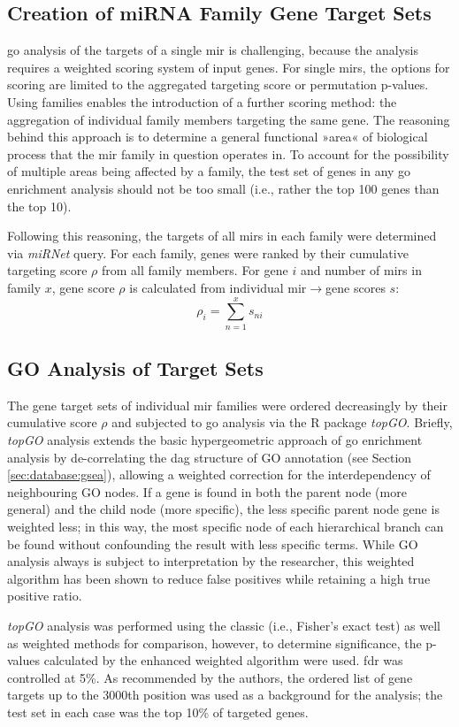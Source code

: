 \begin{method}

\subsection{Creation of miRNA Family Gene Target Sets}
\ac{go} analysis of the targets of a single \ac{mir} is challenging, because the analysis requires a weighted scoring system of input genes. For single \acp{mir}, the options for scoring are limited to the aggregated targeting score or permutation p-values. Using families enables the introduction of a further scoring method: the aggregation of individual family members targeting the same gene. The reasoning behind this approach is to determine a general functional »area« of biological process that the \ac{mir} family in question operates in. To account for the possibility of multiple areas being affected by a family, the test set of genes in any \ac{go} enrichment analysis should not be too small (i.e., rather the top 100 genes than the top 10). 

Following this reasoning, the targets of all \acp{mir} in each family were determined via \textit{miRNet} query. For each family, genes were ranked by their cumulative targeting score $\rho$ from all family members. For gene $i$ and number of \acp{mir} in family $x$, gene score $\rho$ is calculated from individual \ac{mir}$\to$gene scores $s$: $$\rho_{i} = \sum_{n=1}^{x} s_{ni}$$

\subsection{GO Analysis of Target Sets} \label{sec:cellculture:topgo}
The gene target sets of individual \ac{mir} families were ordered decreasingly by their cumulative score $\rho$ and subjected to \ac{go} analysis via the R package \textit{topGO}\cite{Alexa2006}. Briefly, \textit{topGO} analysis extends the basic hypergeometric approach of \ac{go} enrichment analysis by de-correlating the \ac{dag} structure of GO annotation (see Section \ref{sec:database:gsea}), allowing a weighted correction for the interdependency of neighbouring GO nodes. If a gene is found in both the parent node (more general) and the child node (more specific), the less specific parent node gene is weighted less; in this way, the most specific node of each hierarchical branch can be found without confounding the result with less specific terms. While GO analysis always is subject to interpretation by the researcher, this weighted algorithm has been shown to reduce false positives while retaining a high true positive ratio.

\textit{topGO} analysis was performed using the classic (i.e., Fisher's exact test) as well as weighted methods for comparison, however, to determine significance, the p-values calculated by the enhanced weighted algorithm were used. \ac{fdr} was controlled at 5\%. As recommended by the authors, the ordered list of gene targets up to the 3000th position was used as a background for the analysis; the test set in each case was the top 10\% of targeted genes.

\end{method}

